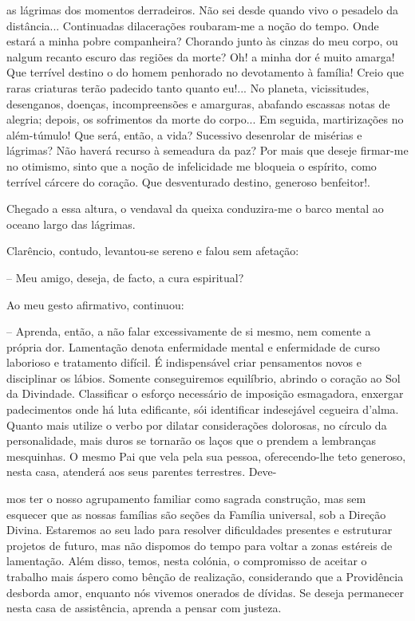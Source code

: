 \documentclass[portuguese,12pt,a4paper]{scrbook}
\begin{document}
	
	as lágrimas dos momentos derradeiros. Não sei desde quando vivo o pesadelo da distância... Continuadas dilacerações roubaram-me a noção do tempo. Onde estará a minha pobre companheira? Chorando junto às cinzas do meu corpo, ou nalgum recanto escuro das regiões da morte? Oh! a minha dor é muito amarga! Que terrível destino o do homem penhorado no devotamento à família! Creio que raras criaturas terão padecido tanto quanto eu!... No planeta, vicissitudes, desenganos, doenças, incompreensões e amarguras, abafando escassas notas de alegria; depois, os sofrimentos da morte do corpo... Em seguida, martirizações no além-túmulo! Que será, então, a vida? Sucessivo desenrolar de misérias e lágrimas? Não haverá recurso à semeadura da paz? Por mais que deseje firmar-me no otimismo, sinto que a noção de infelicidade me bloqueia o espírito, como terrível cárcere do coração. Que desventurado destino, generoso benfeitor!.
	
	Chegado a essa altura, o vendaval da queixa conduzira-me o barco mental ao oceano largo das lágrimas.
	
	Clarêncio, contudo, levantou-se sereno e falou sem afetação:
	
	– Meu amigo, deseja, de facto, a cura espiritual?
	
	Ao meu gesto afirmativo, continuou:
	
	– Aprenda, então, a não falar excessivamente de si mesmo, nem comente a própria dor. Lamentação denota enfermidade mental e enfermidade de curso laborioso e tratamento difícil. É indispensável criar pensamentos novos e disciplinar os lábios. Somente conseguiremos equilíbrio, abrindo o coração ao Sol da Divindade. Classificar o esforço necessário de imposição esmagadora, enxergar padecimentos onde há luta edificante, sói identificar indesejável cegueira d'alma. Quanto mais utilize o verbo por dilatar considerações dolorosas, no círculo da personalidade, mais duros se tornarão os laços que o prendem a lembranças mesquinhas. O mesmo Pai que vela pela sua pessoa, oferecendo-lhe teto generoso, nesta casa, atenderá aos seus parentes terrestres. Deve-
	
	
	mos ter o nosso agrupamento familiar como sagrada construção, mas sem esquecer que as nossas famílias são seções da Família universal, sob a Direção Divina. Estaremos ao seu lado para resolver dificuldades presentes e estruturar projetos de futuro, mas não dispomos do tempo para voltar a zonas estéreis de lamentação. Além disso, temos, nesta colónia, o compromisso de aceitar o trabalho mais áspero como bênção de realização, considerando que a Providência desborda amor, enquanto nós vivemos onerados de dívidas. Se deseja permanecer nesta casa de assistência, aprenda a pensar com justeza.
	
\end{document}
